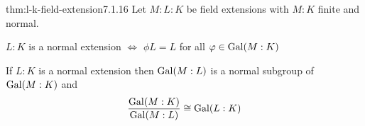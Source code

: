\documentclass[landscape, 8pt]{extarticle}
\begin{document}
\begin{multicols}{3}

\begin{thm}[something]{thm:l-k-field-extension}{7.1.16}
    Let $M : L : K$ be field extensions with $M : K$ finite and normal.
    \begin{enumerate-tight}
        \item $L : K$ is a normal extension $\iff$ $\phi L = L$ for all $\varphi \in \operatorname{Gal}(M : K)$
        \item If $L : K$ is a normal extension then $\operatorname{Gal}(M : L)$ is a normal subgroup of $\operatorname{Gal}(M : K)$ and
            \[\frac{\operatorname{Gal}(M : K)}{\operatorname{Gal}(M : L)} \cong \operatorname{Gal}(L : K)\]
    \end{enumerate-tight}
\end{thm}

\lipsum[1-6]
\end{multicols}
\end{document}
